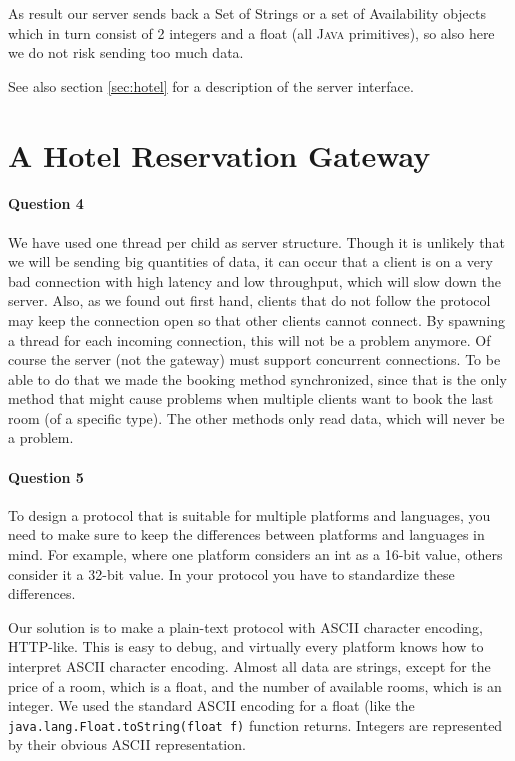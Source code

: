 \documentclass[a4paper,10pt]{article}
\begin{document}
As result our server sends back a Set of Strings or a set of
Availability objects which in turn consist of 2 integers and a float
(all \textsc{Java} primitives), so also here we do not risk sending too much
data.

See also section \ref{sec:hotel} for a description of the server
interface. %

\section{A Hotel Reservation Gateway}
\paragraph{Question 4}
We have used one thread per child as server structure. Though it is
unlikely that we will be sending big quantities of data, it can occur
that a client is on a very bad connection with high latency and low
throughput, which will slow down the server. Also, as we found out
first hand, clients that do not follow the protocol may keep the
connection open so that other clients cannot connect. By spawning a
thread for each incoming connection, this will not be a problem
anymore. Of course the server (not the gateway) must support
concurrent connections. To be able to do that we made the booking
method synchronized, since that is the only method that might cause
problems when multiple clients want to book the last room (of a
specific type). The other methods only read data, which will never be
a problem. %

\paragraph{Question 5}
To design a protocol that is suitable for multiple platforms and
languages, you need to make sure to keep the differences between
platforms and languages in mind. For example, where one platform
considers an int as a 16-bit value, others consider it a 32-bit
value. In your protocol you have to standardize these differences.

Our solution is to make a plain-text protocol with \textsc{ASCII}
character
encoding, \textsc{HTTP}-like. This is easy to debug, and virtually every
platform knows how to interpret \textsc{ASCII} character encoding. Almost all
data are strings, except for the price of a room, which is a float,
and the number of available rooms, which is an integer. We
used the standard \textsc{ASCII} encoding for a float (like the
\texttt{java.lang.Float.toString(float f)} function
returns. Integers are represented by their obvious \textsc{ASCII}
representation.
\end{document}
